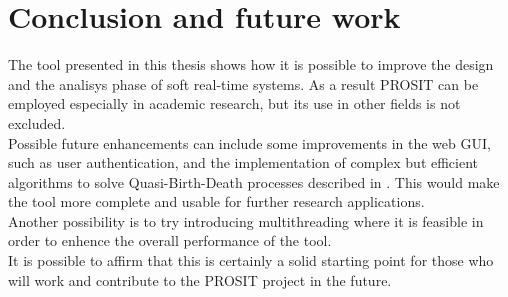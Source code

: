 \chapter{Conclusion and future work}\label{chp:conclusion}


The tool presented in this thesis shows how it is possible to improve the design and the analisys phase of soft real-time systems. As a result PROSIT can be employed especially in academic research, but its use in other fields is not excluded.\\
Possible future enhancements can include some improvements in the web GUI, such as user authentication, and the implementation of complex but efficient algorithms to solve Quasi-Birth-Death processes described in \cite{futurework}. This would make the tool more complete and usable for further research applications.\\
Another possibility is to try introducing multithreading where it is feasible in order to enhence the overall performance of the tool.\\
It is possible to affirm that this is certainly a solid starting point for those who will work and contribute to the PROSIT project in the future.